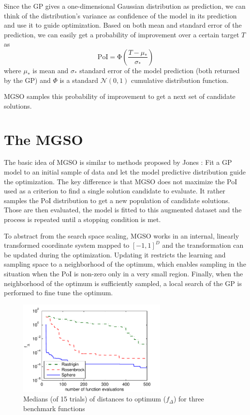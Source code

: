 \documentclass{sig-alt-release2}
\begin{document}
Since the GP gives a one-dimensional Gaussian distribution as prediction, we can think of the distribution's variance
as confidence of the model in its prediction and use it to guide optimization. Based on both mean 
and standard error of the prediction, we can easily get a probability of improvement \cite{jones01taxonomy} over a 
certain target $T$ as
$$
 \mathrm{PoI} = \mathrm{\Phi}\left( \frac{T - \mu_*}{\sigma_*} \right)
$$
where $\mu_*$ is mean and $\sigma_*$ standard error of the model prediction (both returned by the GP) and $\Phi$ is a standard $\mathcal{N}(0,1)$ cumulative distribution function.

MGSO samples this probability of improvement to get a next set of candidate solutions.

\section{The MGSO}

The basic idea of MGSO is similar to methods proposed by Jones \cite{jones01taxonomy}: Fit a 
GP model to an initial sample of data and let the model predictive distribution guide the optimization. 
The key difference is that MGSO does not maximize the PoI used as a criterion to find a single
solution candidate to evaluate. It rather samples the PoI distribution to get a new population of
candidate solutions. Those are then evaluated, the model is fitted to this augmented 
dataset and the process is repeated until a stopping condition is met.

To abstract from the search space scaling, MGSO works in an internal, linearly transformed coordinate system 
mapped to $[-1, 1]^D$ and the transformation can be updated during the optimization. Updating it restricts the 
learning and sampling space to a neighborhood of the optimum, which enables sampling in the situation when 
the PoI is non-zero only in a very small region. Finally, when the neighborhood of the optimum is 
sufficiently sampled, a local search of the GP is performed to fine tune the optimum. 

\begin{figure}
  \centering
  \includegraphics[width=7.5cm]{mgso_3func_2D}

  \caption{
    Medians (of 15 trials) of distances to optimum ($f_{\Delta}$) 
    for three benchmark functions}
  \label{fig:test}
\end{figure}
\end{document}
